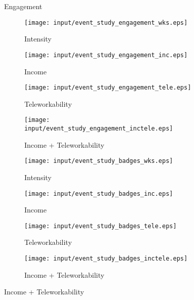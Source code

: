 \begin{figure}
  \caption{Engagement}
    \centering
    \begin{subfigure}[t]{0.45\textwidth}
    \caption{Intensity}
        \centering
        \texttt{[image: input/event\_study\_engagement\_wks.eps]}
    \end{subfigure}%
    \begin{subfigure}[t]{0.45\textwidth}
    \caption{Income}
        \centering
        \texttt{[image: input/event\_study\_engagement\_inc.eps]}
    \end{subfigure}%

    \begin{subfigure}[t]{0.45\textwidth}
    \caption{Teleworkability}
        \centering
        \texttt{[image: input/event\_study\_engagement\_tele.eps]}
    \end{subfigure}%
    \begin{subfigure}[t]{0.45\textwidth}
    \caption{Income + Teleworkability}
        \centering
        \texttt{[image: input/event\_study\_engagement\_inctele.eps]}
    \end{subfigure}%

  \caption{Badges}
    \centering
    \begin{subfigure}[t]{0.45\textwidth}
    \caption{Intensity}
        \centering
        \texttt{[image: input/event\_study\_badges\_wks.eps]}
    \end{subfigure}%
    \begin{subfigure}[t]{0.45\textwidth}
    \caption{Income}
        \centering
        \texttt{[image: input/event\_study\_badges\_inc.eps]}
    \end{subfigure}%

    \begin{subfigure}[t]{0.45\textwidth}
    \caption{Teleworkability}
        \centering
        \texttt{[image: input/event\_study\_badges\_tele.eps]}
    \end{subfigure}%
    \begin{subfigure}[t]{0.45\textwidth}
    \caption{Income + Teleworkability}
        \centering
        \texttt{[image: input/event\_study\_badges\_inctele.eps]}
    \end{subfigure}%
\end{figure}
